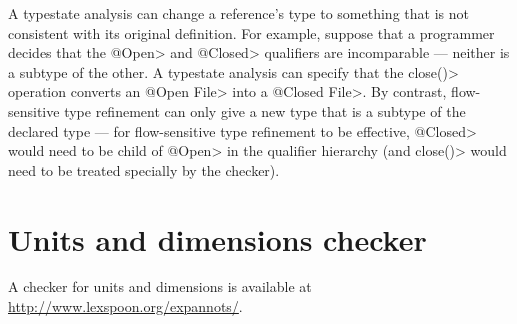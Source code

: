 A typestate analysis can change a reference's type to something that is not
consistent with its original definition.  For example, suppose that a
programmer decides that the \<@Open> and \<@Closed> qualifiers are
incomparable --- neither is a subtype of the other.  A typestate analysis
can specify that the \<close()> operation converts an \<@Open File> into a
\<@Closed File>.  By contrast, flow-sensitive type refinement can only give
a new type that is a subtype of the declared type --- for flow-sensitive
type refinement to be effective, \<@Closed> would need to be child of
\<@Open> in the qualifier hierarchy (and \<close()> would need to be
treated specially by the checker).


\htmlhr
\chapter{Units and dimensions checker\label{units-checker}}

A checker for units and dimensions is available at
\url{http://www.lexspoon.org/expannots/}.


